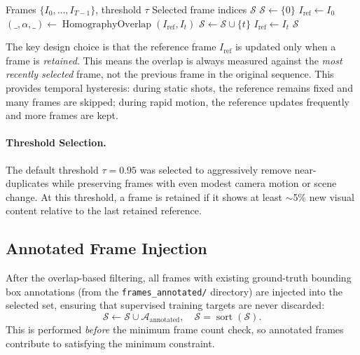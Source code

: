 \documentclass[runningheads]{llncs}
\newcommand{\op}[1]{\operatorname{#1}}
\begin{document}
\begin{algorithm}[h]
\caption{Greedy Frame Selection by Visual Overlap}
\label{alg:greedy}
\begin{algorithmic}[1]
\Require Frames $\{I_0, \ldots, I_{T-1}\}$, threshold $\tau$
\Ensure Selected frame indices $\mathcal{S}$
\State $\mathcal{S} \gets \{0\}$ 
\State $I_{\text{ref}} \gets I_0$ 
    \State $(\_, \alpha, \_) \gets \op{HomographyOverlap}(I_{\text{ref}}, I_t)$ 
    \If{$\alpha < \tau$} 
        \State $\mathcal{S} \gets \mathcal{S} \cup \{t\}$
        \State $I_{\text{ref}} \gets I_t$ 
    \EndIf
\EndFor
\State \Return $\mathcal{S}$
\end{algorithmic}
\end{algorithm}

The key design choice is that the reference frame $I_{\text{ref}}$ is updated only when a frame is \emph{retained}.  This means the overlap is always measured against the \emph{most recently selected} frame, not the previous frame in the original sequence.  This provides temporal hysteresis: during static shots, the reference remains fixed and many frames are skipped; during rapid motion, the reference updates frequently and more frames are kept.

\paragraph{Threshold Selection.}  The default threshold $\tau = 0.95$ was selected to aggressively remove near-duplicates while preserving frames with even modest camera motion or scene change.  At this threshold, a frame is retained if it shows at least $\sim$5\% new visual content relative to the last retained reference.

\subsection{Annotated Frame Injection}
\label{sec:annotated}

After the overlap-based filtering, all frames with existing ground-truth bounding box annotations (from the \texttt{frames\_annotated/} directory) are injected into the selected set, ensuring that supervised training targets are never discarded:
\begin{equation}
    \mathcal{S} \gets \mathcal{S} \cup \mathcal{A}_{\text{annotated}}, \quad  \mathcal{S} = \op{sort}(\mathcal{S}).
    \label{eq:inject}
\end{equation}
This is performed \emph{before} the minimum frame count check, so annotated frames contribute to satisfying the minimum constraint.
\end{document}
